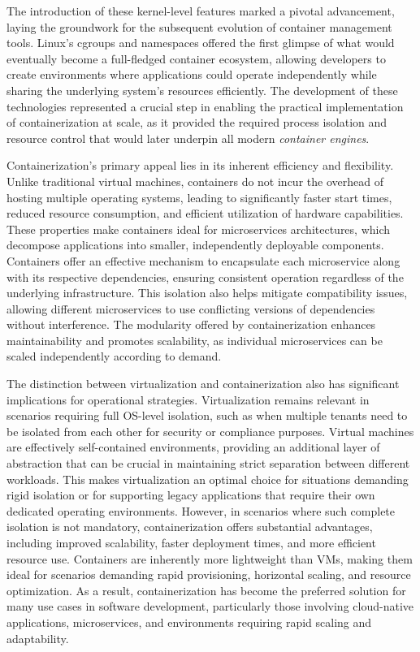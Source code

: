 The introduction of these kernel-level features marked a pivotal advancement, laying the groundwork for the subsequent evolution of container management tools. Linux's cgroups and namespaces offered the first glimpse of what would eventually become a full-fledged container ecosystem, allowing developers to create environments where applications could operate independently while sharing the underlying system's resources efficiently. The development of these technologies represented a crucial step in enabling the practical implementation of containerization at scale, as it provided the required process isolation and resource control that would later underpin all modern \emph{container engines}.

Containerization's primary appeal lies in its inherent efficiency and flexibility. Unlike traditional virtual machines, containers do not incur the overhead of hosting multiple operating systems, leading to significantly faster start times, reduced resource consumption, and efficient utilization of hardware capabilities. These properties make containers ideal for microservices architectures, which decompose applications into smaller, independently deployable components. Containers offer an effective mechanism to encapsulate each microservice along with its respective dependencies, ensuring consistent operation regardless of the underlying infrastructure. This isolation also helps mitigate compatibility issues, allowing different microservices to use conflicting versions of dependencies without interference. The modularity offered by containerization enhances maintainability and promotes scalability, as individual microservices can be scaled independently according to demand.

The distinction between virtualization and containerization also has significant implications for operational strategies. Virtualization remains relevant in scenarios requiring full OS-level isolation, such as when multiple tenants need to be isolated from each other for security or compliance purposes. Virtual machines are effectively self-contained environments, providing an additional layer of abstraction that can be crucial in maintaining strict separation between different workloads. This makes virtualization an optimal choice for situations demanding rigid isolation or for supporting legacy applications that require their own dedicated operating environments. However, in scenarios where such complete isolation is not mandatory, containerization offers substantial advantages, including improved scalability, faster deployment times, and more efficient resource use. Containers are inherently more lightweight than VMs, making them ideal for scenarios demanding rapid provisioning, horizontal scaling, and resource optimization. As a result, containerization has become the preferred solution for many use cases in software development, particularly those involving cloud-native applications, microservices, and environments requiring rapid scaling and adaptability.

